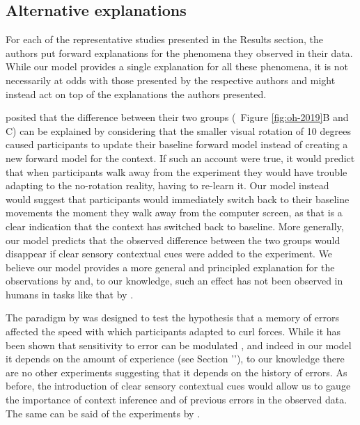 \documentclass[a4paper,doc,floatsintext,natbib]{apa6}
\def \fref #1{Figure \ref{#1}}     %
\def \sref #1{Section '\nameref{#1}'}    %
\begin{document}
\subsection{Alternative explanations}
For each of the representative studies presented in the Results section, the authors put forward explanations for the phenomena they observed in their data. While our model provides a single explanation for all these phenomena, it is not necessarily at odds with those presented by the respective authors and might instead act on top of the explanations the authors presented.

\cite{Oh_Minimizing_2019} posited that the difference between their two groups (~\fref{fig:oh-2019}B and C) can be explained by considering that the smaller visual rotation of 10 degrees caused participants to update their baseline forward model instead of creating a new forward model for the context. If such an account were true, it would predict that when participants walk away from the experiment they would have trouble adapting to the no-rotation reality, having to re-learn it. Our model instead would suggest that participants would immediately switch back to their baseline movements the moment they walk away from the computer screen, as that is a clear indication that the context has switched back to baseline. More generally, our model predicts that the observed difference between the two groups would disappear if clear sensory contextual cues were added to the experiment. We believe our model provides a more general and principled explanation for the observations by \cite{Oh_Minimizing_2019} and, to our knowledge, such an effect has not been observed in humans in tasks like that by \cite{Oh_Minimizing_2019}.

The paradigm by \cite{Herzfeld_memory_2014} was designed to test the hypothesis that a memory of errors affected the speed with which participants adapted to curl forces. While it has been shown that sensitivity to error can be modulated \cite{Marko_Sensitivity_2012}, and indeed in our model it depends on the amount of experience (see \sref{sec:interpreting-hyperparameters}), to our knowledge there are no other experiments suggesting that it depends on the history of errors. As before, the introduction of clear sensory contextual cues would allow us to gauge the importance of context inference and of previous errors in the observed data. The same can be said of the experiments by \cite{Davidson_Scaling_2004}.
\end{document}
